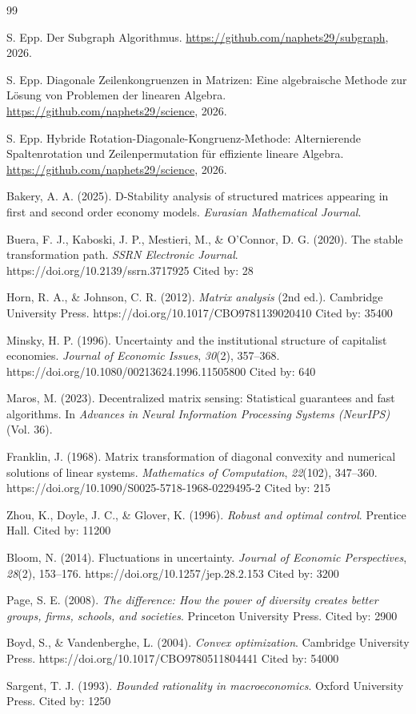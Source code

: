 \documentclass[a4paper,12pt]{article}
\theoremstyle{definition}
\begin{document}
\begin{thebibliography}{99}
  
S. Epp. Der Subgraph Algorithmus. \url{https://github.com/naphets29/subgraph}, 2026.

S. Epp. Diagonale Zeilenkongruenzen in Matrizen: Eine algebraische Methode zur Lösung von Problemen der linearen Algebra. \url{https://github.com/naphets29/science}, 2026.

S. Epp. Hybride Rotation-Diagonale-Kongruenz-Methode: Alternierende Spaltenrotation und Zeilenpermutation für effiziente lineare Algebra. \url{https://github.com/naphets29/science}, 2026.

Bakery, A. A. (2025). D-Stability analysis of structured matrices appearing in first and second order economy models. \textit{Eurasian Mathematical Journal}.

Buera, F. J., Kaboski, J. P., Mestieri, M., \& O’Connor, D. G. (2020). The stable transformation path. \textit{SSRN Electronic Journal}. https://doi.org/10.2139/ssrn.3717925
Cited by: 28

Horn, R. A., \& Johnson, C. R. (2012). \textit{Matrix analysis} (2nd ed.). Cambridge University Press. https://doi.org/10.1017/CBO9781139020410
Cited by: 35400

Minsky, H. P. (1996). Uncertainty and the institutional structure of capitalist economies. \textit{Journal of Economic Issues}, \textit{30}(2), 357–368. https://doi.org/10.1080/00213624.1996.11505800
Cited by: 640

Maros, M. (2023). Decentralized matrix sensing: Statistical guarantees and fast algorithms. In \textit{Advances in Neural Information Processing Systems (NeurIPS)} (Vol. 36).

Franklin, J. (1968). Matrix transformation of diagonal convexity and numerical solutions of linear systems. \textit{Mathematics of Computation}, \textit{22}(102), 347–360. https://doi.org/10.1090/S0025-5718-1968-0229495-2
Cited by: 215

Zhou, K., Doyle, J. C., \& Glover, K. (1996). \textit{Robust and optimal control}. Prentice Hall.
Cited by: 11200

Bloom, N. (2014). Fluctuations in uncertainty. \textit{Journal of Economic Perspectives}, \textit{28}(2), 153–176. https://doi.org/10.1257/jep.28.2.153
Cited by: 3200

Page, S. E. (2008). \textit{The difference: How the power of diversity creates better groups, firms, schools, and societies}. Princeton University Press.
Cited by: 2900

Boyd, S., \& Vandenberghe, L. (2004). \textit{Convex optimization}. Cambridge University Press. https://doi.org/10.1017/CBO9780511804441
Cited by: 54000

Sargent, T. J. (1993). \textit{Bounded rationality in macroeconomics}. Oxford University Press.
Cited by: 1250

\end{thebibliography}
\end{document}
